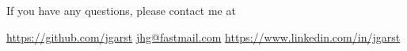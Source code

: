 \documentclass[11pt,a4paper]{article}
\begin{document}
\vfill

\begin{center}
    If you have any questions, please contact me at
\end{center}

\begin{center}
  \href{https://github.com/jgarst}{https://github.com/jgarst} 
  \textbullet{}
  \href{jhg@fastmail.com}{jhg@fastmail.com}
  \textbullet{}
  \href{https://www.linkedin.com/in/jgarst}
       {https://www.linkedin.com/in/jgarst}
\end{center}
\end{document}
